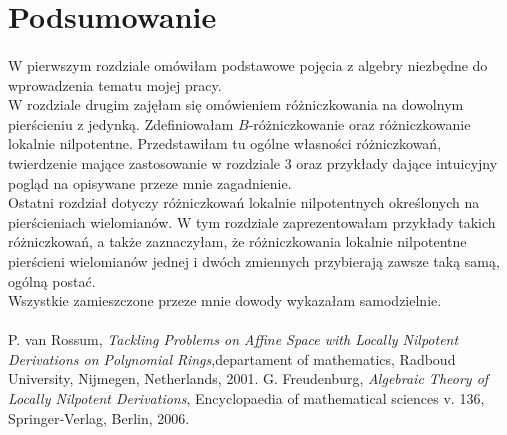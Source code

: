 \documentclass[12pt,a4paper]{article}
\numberwithin{equation}{section}
\begin{document}
\newpage
\section*{Podsumowanie}
\paragraph{}

\indent W pierwszym rozdziale omówiłam podstawowe pojęcia z algebry niezbędne do wprowadzenia tematu mojej pracy.\\
\indent W rozdziale drugim zajęłam się omówieniem różniczkowania na dowolnym pierścieniu z jedynką. Zdefiniowałam $B$-różniczkowanie oraz różniczkowanie lokalnie nilpotentne. Przedstawiłam tu ogólne własności różniczkowań, twierdzenie mające zastosowanie w rozdziale 3 oraz przykłady dające intuicyjny pogląd na opisywane przeze mnie zagadnienie.\\
\indent Ostatni rozdział dotyczy różniczkowań lokalnie 
nilpotentnych określonych na pierścieniach wielomianów. W tym rozdziale zaprezentowałam przykłady 
takich różniczkowań, a także zaznaczyłam, że różniczkowania lokalnie nilpotentne pierścieni wielomianów jednej i dwóch 
zmiennych przybierają zawsze taką samą, ogólną postać. 
\\Wszystkie zamieszczone przeze mnie dowody wykazałam samodzielnie. 
\paragraph{}

	\newpage
	\begin{thebibliography}{3}
		 P. van Rossum, \textit{Tackling Problems on Affine Space with Locally Nilpotent Derivations on Polynomial Rings},departament of mathematics, Radboud University, Nijmegen, Netherlands, 2001.
		 G. Freudenburg, \textit{Algebraic Theory of Locally Nilpotent Derivations}, Encyclopaedia of mathematical sciences v. 136, Springer-Verlag, Berlin, 2006.
%
	\end{thebibliography}
\end{document}
